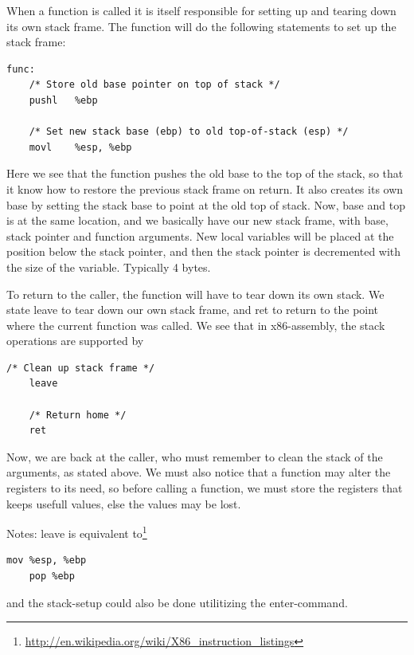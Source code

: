 \documentclass[english,a4paper]{scrartcl}
\begin{document}
When a function is called it is itself responsible for setting up and tearing
down its own stack frame.  The function will do the following statements to set up the
stack frame:
\begin{lstlisting}[language={[x86masm]Assembler}]
func:
    /* Store old base pointer on top of stack */
    pushl   %ebp

    /* Set new stack base (ebp) to old top-of-stack (esp) */
    movl    %esp, %ebp
\end{lstlisting}
Here we see that the function pushes the old base to the top of the stack, so
that it know how to restore the previous stack frame on return. It also creates
its own base by setting the stack base to point at the old
top of stack. Now, base and top is at the same location, and we basically have
our new stack frame, with base, stack pointer and function arguments. New local
variables will be placed at the position below the stack pointer, and then the
stack pointer is decremented with the size of the variable. Typically 4 bytes.

To  return to the caller, the function will have to tear down its own stack. We
state {\ttfamily leave} to tear down our own stack frame, and {\ttfamily ret} to
return to the point where the current function was called. We see that in
x86-assembly, the stack operations are supported by 

\begin{lstlisting}[language={[x86masm]Assembler}]
	/* Clean up stack frame */
	leave

	/* Return home */
	ret
\end{lstlisting}
Now, we are back at the caller, who must remember to clean the stack of the
arguments, as stated above. We must also notice that a function may alter the
registers to its need, so before calling a function, we must store the
registers that keeps usefull values, else the values may be lost.

Notes:
{\ttfamily leave} is equivalent
to\footnote{\url{http://en.wikipedia.org/wiki/X86_instruction_listings}}
\begin{lstlisting}[language={[x86masm]Assembler}]
	mov %esp, %ebp
	pop %ebp
\end{lstlisting}
and the stack-setup could also be done utilitizing the {\ttfamily
enter}-command.

\newpage
\end{document}
